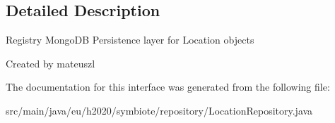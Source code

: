 \subsection{Detailed Description}
Registry Mongo\+DB Persistence layer for Location objects

Created by mateuszl 

The documentation for this interface was generated from the following file\+:\begin{DoxyCompactItemize}
\item 
src/main/java/eu/h2020/symbiote/repository/Location\+Repository.\+java\end{DoxyCompactItemize}
